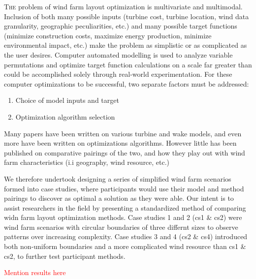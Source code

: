 

\lettrine[nindent=0pt]{T}{he} problem of wind farm layout optimization is multivariate and multimodal.
Inclusion of both many possible inputs (turbine cost, turbine location, wind data granularity, geographic peculiarities, etc.) and many possible target functions (minimize construction costs, maximize energy production, minimize environmental impact, etc.) make the problem as simplistic or as complicated as the user desires.
Computer automated modelling is used to analyze variable permutations and optimize target function calculations on a scale far greater than could be accomplished solely through real-world experimentation.
For these computer optimizations to be successful, two separate factors must be addressed:
\begin{enumerate}
    \item Choice of model inputs and target 
    \item Optimization algorithm selection
\end{enumerate}

Many papers have been written on various turbine and wake models, and even more have been written on optimizations algorithms.
However little has been published on comparative pairings of the two, and how they play out with wind farm characteristics (i.i geography, wind resource, etc.)

We therefore undertook designing a series of simplified wind farm scenarios formed into case studies, where participants would use their model and method pairings to discover as optimal a solution as they were able.
Our intent is to assist researchers in the field by presenting a standardized method of comparing widn farm layout optimization methods.
Case studies 1 and 2 (cs1 \& cs2) were wind farm scenarios with circular boundaries of three differnt sizes to observe patterns over increasing complexity.
Case studies 3 and 4 (cs2 \& cs4) introduced both non-uniform boundaries and a more complicated wind resource than cs1 \& cs2, to further test participant methods.

\textcolor{red}{Mention results here}

